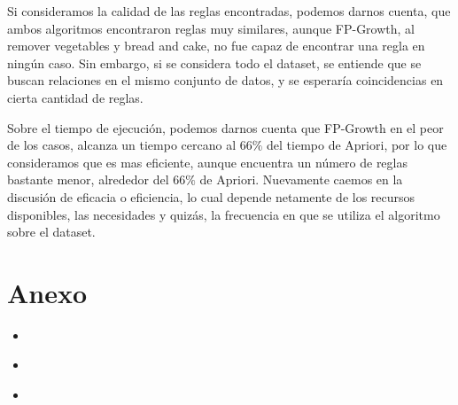 \documentclass{article}
\newcommand{\python}[2]{
  \begin{itemize}
    \item[]
  \end{itemize}
}
\newcommand{\bash}[2]{
  \begin{itemize}
    \item[]
  \end{itemize}
}
\begin{document}
Si consideramos la calidad de las reglas encontradas, podemos darnos cuenta, que ambos algoritmos encontraron reglas muy similares, aunque FP-Growth, al remover vegetables y bread and cake, no fue capaz de encontrar una regla en ningún caso. Sin embargo, si se considera todo el dataset, se entiende que se buscan relaciones en el mismo conjunto de datos, y se esperaría coincidencias en cierta cantidad de reglas.

Sobre el tiempo de ejecución, podemos darnos cuenta que FP-Growth en el peor de los casos, alcanza un tiempo cercano al $66\%$ del tiempo de Apriori, por lo que consideramos que es mas eficiente, aunque encuentra un número de reglas bastante menor, alrededor del $66\%$ de Apriori. Nuevamente caemos en la discusión de eficacia o eficiencia, lo cual depende netamente de los recursos disponibles, las necesidades y quizás, la frecuencia en que se utiliza el algoritmo sobre el dataset.

\section{Anexo}\label{anexo}

  \python{src/plotter}{Generador de gráficos para todos los parámetros}
  \bash{src/run}{Ejecuta Weka dado los parámetros indicados}
  \bash{src/filter}{Filtra elementos específicos del dataset}
\end{document}
